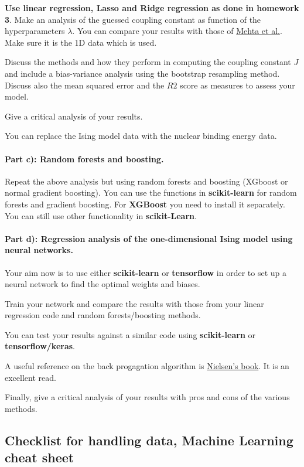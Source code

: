 \documentclass[%
oneside,                 %
final,                   %
10pt]{article}
\begin{document}
\textbf{Use linear regression,
Lasso and Ridge regression as done in homework 3}.
Make an analysis of the guessed coupling constant as function of the hyperparameters $\lambda$. 
You can compare your
results with those of \href{{https://physics.bu.edu/~pankajm/ML-Notebooks/HTML/NB_CVI-linreg_ising.html}}{Mehta
et al.}.
Make sure it is the 1D data which is used.

Discuss the methods and how they perform in computing the coupling
constant $J$ and include a bias-variance analysis using the bootstrap resampling method.
Discuss also the mean squared error and
the $R2$ score as measures to assess your model.

Give a critical analysis of your results.

You can replace the Ising model data with the nuclear binding energy data.

\paragraph{Part c): Random forests and boosting.}
Repeat the above analysis but using random forests and boosting (XGboost or normal gradient boosting). You can use the functions
in \textbf{scikit-learn} for random forests and gradient boosting. For \textbf{XGBoost} you need to install it separately. You can still use other functionality in \textbf{scikit-Learn}. 

\paragraph{Part d): Regression analysis of the one-dimensional Ising model using neural networks.}
Your aim now is to use either \textbf{scikit-learn} or \textbf{tensorflow} in order to set up a neural network to find the optimal weights and biases. 

Train your network and compare the results with those from your linear regression code and random forests/boosting methods. 

You can test your results against a similar code using \textbf{scikit-learn} or \textbf{tensorflow/keras}. 

A useful reference on the back progagation algorithm is \href{{http://neuralnetworksanddeeplearning.com/}}{Nielsen's book}. It is an excellent read.

Finally, give a critical analysis of your results with pros and cons of the various methods. 

\subsection{Checklist for handling data, Machine Learning cheat sheet}
\end{document}
